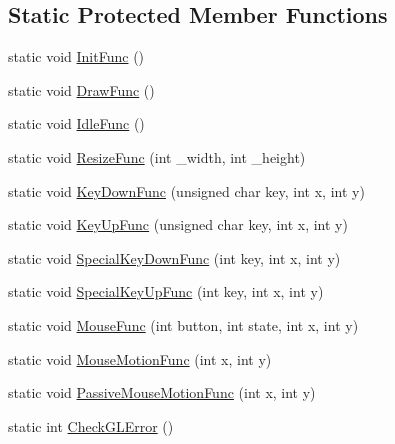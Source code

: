 \subsection*{Static Protected Member Functions}
\begin{DoxyCompactItemize}
\item 
static void \hyperlink{class_engine_abe5871e891fe327f17cb8bf28693e45d}{Init\+Func} ()
\item 
static void \hyperlink{class_engine_a0e5ef99e1d81785bd157634a9fe583ce}{Draw\+Func} ()
\item 
static void \hyperlink{class_engine_a5a05897a147382a9d271c8dbd262b4a5}{Idle\+Func} ()
\item 
static void \hyperlink{class_engine_abbc06815bf06ce7d560c1965067fa2e7}{Resize\+Func} (int \+\_\+width, int \+\_\+height)
\item 
static void \hyperlink{class_engine_ae201229f027168e251abc776d2e9a2e0}{Key\+Down\+Func} (unsigned char key, int x, int y)
\item 
static void \hyperlink{class_engine_a3f2e2df3c913b773cc185d21860da5d6}{Key\+Up\+Func} (unsigned char key, int x, int y)
\item 
static void \hyperlink{class_engine_ac21b173d6d9ec44c363989c3666061f5}{Special\+Key\+Down\+Func} (int key, int x, int y)
\item 
static void \hyperlink{class_engine_a0c66abbd2cfd67a99943d65f64a7951d}{Special\+Key\+Up\+Func} (int key, int x, int y)
\item 
static void \hyperlink{class_engine_ad016f923c1e398e192caed6e5ca9d66b}{Mouse\+Func} (int button, int state, int x, int y)
\item 
static void \hyperlink{class_engine_a163556fac75da746d32a4e776ca1461b}{Mouse\+Motion\+Func} (int x, int y)
\item 
static void \hyperlink{class_engine_a85c184fddc04c11711d7d257bb5e7954}{Passive\+Mouse\+Motion\+Func} (int x, int y)
\item 
static int \hyperlink{class_engine_ab6b8b85aa27ec75c3a0b61c38453c372}{Check\+G\+L\+Error} ()
\end{DoxyCompactItemize}
